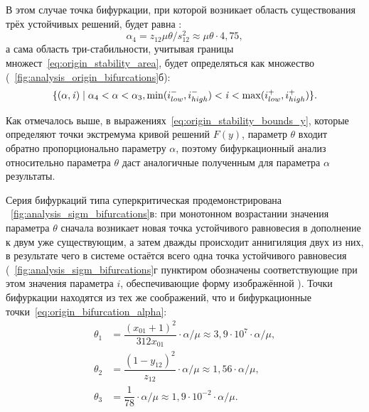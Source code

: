 В этом случае точка бифуркации, при которой возникает область существования трёх устойчивых решений, будет равна :
\begin{equation}
    \nonumber
    \alpha_{4} = z_{12} \mu \theta / s_{12}^{2} \approx  \mu \theta \cdot 4,75,
\end{equation}
а сама область три-стабильности, учитывая границы множест~\eqref{eq:origin_stability_area}, будет определяться как множество (\seefigure~\ref{fig:analysis_origin_bifurcations}б):
\begin{equation}
    \label{eq:origin_stability_area_ext}
    \{ (\alpha, \mathit{i}) \mid \alpha_{4} < \alpha < \alpha_{3}, \min(i^{-}_{low}, i^{-}_{high}) < \mathit{i} < \max(i^{+}_{low}, i^{+}_{high}) \}.
\end{equation}

Как отмечалось выше, в выражениях~\eqref{eq:origin_stability_bounds_y}, которые определяют точки экстремума кривой решений $F(y)$, параметр $\theta$ входит обратно пропорционально параметру $\alpha$, поэтому бифуркационный анализ относительно параметра $\theta$ даст аналогичные полученным для параметра $\alpha$ результаты.

Серия бифуркаций типа суперкритическая  продемонстрирована \onfigure~\ref{fig:analysis_sigm_bifurcations}в: при монотонном возрастании значения параметра $\theta$ сначала возникает новая точка устойчивого равновесия в дополнение к двум уже существующим, а затем дважды происходит аннигиляция двух из них, в результате чего в системе остаётся всего одна точка устойчивого равновесия (\onfigure~\ref{fig:analysis_sigm_bifurcations}г пунктиром обозначены соответствующие при этом значения параметра $i$, обеспечивающие форму изображённой ). Точки бифуркации находятся из тех же соображений, что и бифуркационные точки~\eqref{eq:origin_bifurcation_alpha}:
\begin{equation}
    \nonumber
    \begin{aligned}
        \theta_{1} &= \dfrac{(x_{01} + 1)^2}{312 x_{01}} \cdot \alpha / \mu     \approx 3,9 \cdot 10^{7} \cdot \alpha / \mu, \\
        \theta_{2} &= \dfrac{(1 - y_{12})^2}{z_{12}} \cdot \alpha / \mu         \approx 1,56 \cdot \alpha / \mu, \\
        \theta_{3} &= \dfrac{1}{78} \cdot \alpha / \mu                          \approx 1,9 \cdot 10^{-2} \cdot \alpha / \mu.
    \end{aligned}
\end{equation}

